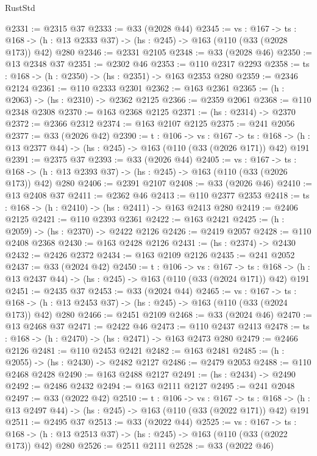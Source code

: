 \begin{lexlean}{RustStd}
\begin{coremodule}
{\begin{coremodule}
{{{@2331 := @2315 @37
@2333 := @33 (@2028 @44)
@2345 := {vs : @167} ->
  {ts : @168} -> (h : @13 @2333 @37) -> (hs : @245) -> @163 (@110 (@33 (@2028 @173)) @42) @280
@2346 := @2331 @2105
@2348 := @33 (@2028 @46)
@2350 := @13 @2348 @37
@2351 := @2302 @46
@2353 := @110 @2317 @2293
@2358 := {ts : @168} -> (h : @2350) -> (hs : @2351) -> @163 @2353 @280
@2359 := @2346 @2124
@2361 := @110 @2333 @2301
@2362 := @163 @2361
@2365 := (h : @2063) -> (hs : @2310) -> @2362 @2125
@2366 := @2359 @2061
@2368 := @110 @2348 @2308
@2370 := @163 @2368 @2125
@2371 := (hs : @2314) -> @2370
@2372 := @2366 @2312
@2374 := @163 @2107 @2125
@2375 := @241 @2056
@2377 := @33 (@2026 @42)
@2390 := {t : @106} ->
  {vs : @167} ->
  {ts : @168} -> (h : @13 @2377 @44) -> (hs : @245) -> @163 (@110 (@33 (@2026 @171)) @42) @191
@2391 := @2375 @37
@2393 := @33 (@2026 @44)
@2405 := {vs : @167} ->
  {ts : @168} -> (h : @13 @2393 @37) -> (hs : @245) -> @163 (@110 (@33 (@2026 @173)) @42) @280
@2406 := @2391 @2107
@2408 := @33 (@2026 @46)
@2410 := @13 @2408 @37
@2411 := @2362 @46
@2413 := @110 @2377 @2353
@2418 := {ts : @168} -> (h : @2410) -> (hs : @2411) -> @163 @2413 @280
@2419 := @2406 @2125
@2421 := @110 @2393 @2361
@2422 := @163 @2421
@2425 := (h : @2059) -> (hs : @2370) -> @2422 @2126
@2426 := @2419 @2057
@2428 := @110 @2408 @2368
@2430 := @163 @2428 @2126
@2431 := (hs : @2374) -> @2430
@2432 := @2426 @2372
@2434 := @163 @2109 @2126
@2435 := @241 @2052
@2437 := @33 (@2024 @42)
@2450 := {t : @106} ->
  {vs : @167} ->
  {ts : @168} -> (h : @13 @2437 @44) -> (hs : @245) -> @163 (@110 (@33 (@2024 @171)) @42) @191
@2451 := @2435 @37
@2453 := @33 (@2024 @44)
@2465 := {vs : @167} ->
  {ts : @168} -> (h : @13 @2453 @37) -> (hs : @245) -> @163 (@110 (@33 (@2024 @173)) @42) @280
@2466 := @2451 @2109
@2468 := @33 (@2024 @46)
@2470 := @13 @2468 @37
@2471 := @2422 @46
@2473 := @110 @2437 @2413
@2478 := {ts : @168} -> (h : @2470) -> (hs : @2471) -> @163 @2473 @280
@2479 := @2466 @2126
@2481 := @110 @2453 @2421
@2482 := @163 @2481
@2485 := (h : @2055) -> (hs : @2430) -> @2482 @2127
@2486 := @2479 @2053
@2488 := @110 @2468 @2428
@2490 := @163 @2488 @2127
@2491 := (hs : @2434) -> @2490
@2492 := @2486 @2432
@2494 := @163 @2111 @2127
@2495 := @241 @2048
@2497 := @33 (@2022 @42)
@2510 := {t : @106} ->
  {vs : @167} ->
  {ts : @168} -> (h : @13 @2497 @44) -> (hs : @245) -> @163 (@110 (@33 (@2022 @171)) @42) @191
@2511 := @2495 @37
@2513 := @33 (@2022 @44)
@2525 := {vs : @167} ->
  {ts : @168} -> (h : @13 @2513 @37) -> (hs : @245) -> @163 (@110 (@33 (@2022 @173)) @42) @280
@2526 := @2511 @2111
@2528 := @33 (@2022 @46)
}}}
\end{coremodule}}
\end{coremodule}
\end{lexlean}
